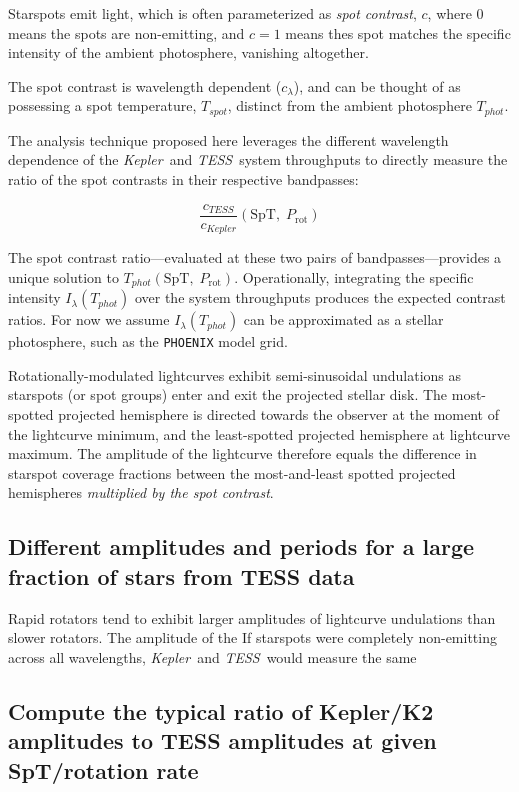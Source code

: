 \documentclass[letterpaper,11pt]{article}
\newcommand{\tess}{{\it TESS}}
\newcommand{\kepler}{{\it Kepler}}
\begin{document}
Starspots emit light, which is often parameterized as \emph{spot contrast}, $c$, where 0 means the spots are non-emitting, and $c=1$ means thes spot matches the specific intensity of the ambient photosphere, vanishing altogether.

The spot contrast is wavelength dependent ($c_\lambda$), and can be thought of as possessing a spot temperature, $T_{spot}$, distinct from the ambient photosphere $T_{phot}$.

The analysis technique proposed here leverages the different wavelength dependence of the \kepler\ and \tess\ system throughputs to directly measure the ratio of the spot contrasts in their respective bandpasses:

$$\frac{c_{TESS}}{c_{Kepler}}(\mathrm{SpT},\;P_{\mathrm{rot}})$$

The spot contrast ratio---evaluated at these two pairs of bandpasses---provides a unique solution to $T_{phot}(\mathrm{SpT},\;P_{\mathrm{rot}})$.  Operationally, integrating the specific intensity $I_\lambda(T_{phot})$ over the system throughputs produces the expected contrast ratios.  For now we assume $I_\lambda(T_{phot})$ can be approximated as a stellar photosphere, such as the \texttt{PHOENIX} model grid.

Rotationally-modulated lightcurves exhibit semi-sinusoidal undulations as starspots (or spot groups) enter and exit the projected stellar disk.  The most-spotted projected hemisphere is directed towards the observer at the moment of the lightcurve minimum, and the least-spotted projected hemisphere at lightcurve maximum.  The amplitude of the lightcurve therefore equals the difference in starspot coverage fractions between the most-and-least spotted projected hemispheres \emph{multiplied by the spot contrast}.


\subsection{Different amplitudes and periods for a large fraction of stars from TESS data}

Rapid rotators tend to exhibit larger amplitudes of lightcurve undulations than slower rotators.  The amplitude of the If starspots were completely non-emitting across all wavelengths, \kepler\ and \tess\ would measure the same

\subsection{Compute the typical ratio of Kepler/K2 amplitudes to TESS amplitudes at given SpT/rotation rate}
\end{document}
